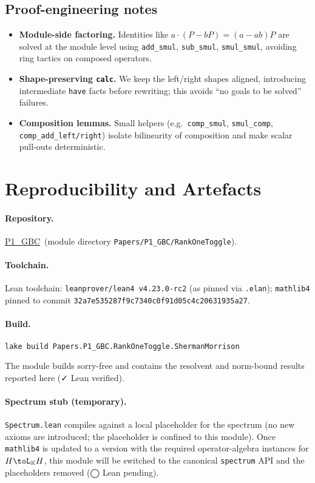 \documentclass[11pt]{article}
\theoremstyle{definition}
\newcommand{\K}{\mathbb{K}}
\newcommand{\leanRepoTag}{\href{https://github.com/AICardiologist/FoundationRelativity/tree/main/Papers/P1_GBC}{P1\_GBC}}
\newcommand{\leanok}{\textsf{\small \textcolor{green!60!black}{✓ Lean verified}}}
\newcommand{\leanpending}{\textsf{\small \textcolor{orange!80!black}{◯ Lean pending}}}
\begin{document}
\subsection*{Proof-engineering notes}
\begin{itemize}
\item \textbf{Module-side factoring.} Identities like $a\cdot(P-bP)=(a-ab)P$ are solved at the module level using \texttt{add\_smul}, \texttt{sub\_smul}, \texttt{smul\_smul}, avoiding ring tactics on composed operators.
\item \textbf{Shape-preserving \texttt{calc}.} We keep the left/right shapes aligned, introducing intermediate \texttt{have} facts before rewriting; this avoids ``no goals to be solved'' failures.
\item \textbf{Composition lemmas.} Small helpers (e.g.\ \texttt{comp\_smul}, \texttt{smul\_comp}, \texttt{comp\_add\_{left/right}}) isolate bilinearity of composition and make scalar pull-outs deterministic.
\end{itemize}

\section{Reproducibility and Artefacts}\label{sec:artefacts}

\paragraph{Repository.} \leanRepoTag\ (module directory \texttt{Papers/P1\_GBC/RankOneToggle}).

\paragraph{Toolchain.} Lean toolchain: \texttt{leanprover/lean4 v4.23.0-rc2} (as pinned via \texttt{.elan}); \texttt{mathlib4} pinned to commit \texttt{32a7e535287f9c7340c0f91d05c4c20631935a27}.  %

\paragraph{Build.}
\begin{verbatim}
lake build Papers.P1_GBC.RankOneToggle.ShermanMorrison
\end{verbatim}
The module builds sorry-free and contains the resolvent and norm-bound results reported here (\leanok).

\paragraph{Spectrum stub (temporary).}  %
\texttt{Spectrum.lean} compiles against a local placeholder for the spectrum (no new axioms are introduced; the placeholder is confined to this module). Once \texttt{mathlib4} is updated to a version with the required operator-algebra instances for $H\toL_{\K}H$, this module will be switched to the canonical \texttt{spectrum} API and the placeholders removed (\leanpending).
\end{document}
